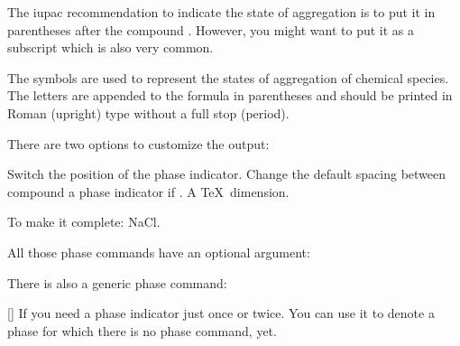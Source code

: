 \documentclass{chemmacros-manual}
\makeatletter
\renewenvironment{commands}
  {%
    \let\command\cnltx@command
    \let\explcommand\cnltx@explcommand
    \cnltxlist
  }
  {\endcnltxlist}
\makeatother
\begin{document}
The \ac{iupac} recommendation to indicate the state of aggregation is to put
it in parentheses after the compound \cite{iupac:greenbook}.  However, you
might want to put it as a subscript which is also very common.

\begin{cnltxquote}
  The \textelp{} symbols are used to represent the states of aggregation of
  chemical species.  The letters are appended to the formula in parentheses
  and should be printed in Roman (upright) type without a full stop (period).
\end{cnltxquote}

There are two options to customize the output:
\begin{options}
    Switch the position of the phase indicator.
  \Default{.1333em}
    Change the default spacing between compound a phase indicator if
    . A \TeX\ dimension.
\end{options}
\begin{example}
  \par
  To make it complete: NaCl\aq.
\end{example}

All those phase commands have an optional argument:
\begin{example}
\end{example}

There is also a generic phase command:
\begin{commands}
  \command{phase}[]
    If you need a phase indicator just once or twice.  You can use it to
    denote a phase for which there is no phase command, yet.
\end{commands}
\end{document}
